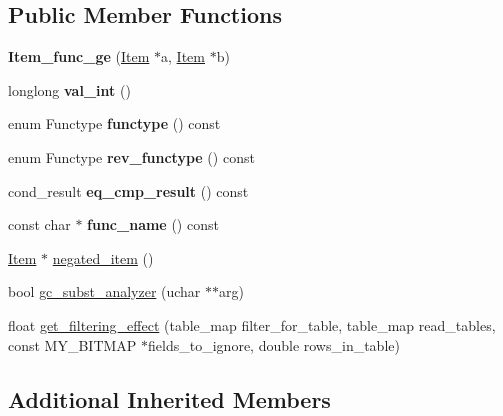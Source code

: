 \subsection*{Public Member Functions}
\begin{DoxyCompactItemize}
\item 
\mbox{\label{classItem__func__ge_a821ea7d8b39396a6848d1951da6a8709}} 
{\bfseries Item\+\_\+func\+\_\+ge} (\mbox{\hyperlink{classItem}{Item}} $\ast$a, \mbox{\hyperlink{classItem}{Item}} $\ast$b)
\item 
\mbox{\label{classItem__func__ge_add571e7245e6aca5de310390790a47e5}} 
longlong {\bfseries val\+\_\+int} ()
\item 
\mbox{\label{classItem__func__ge_ae06acbd8529eb4528dbf8c39cf93e771}} 
enum Functype {\bfseries functype} () const
\item 
\mbox{\label{classItem__func__ge_ad7bd673a6388a820604c86aeed8e102f}} 
enum Functype {\bfseries rev\+\_\+functype} () const
\item 
\mbox{\label{classItem__func__ge_a20ee5b3ea79cc8dcac8e7ef39a6f9561}} 
cond\+\_\+result {\bfseries eq\+\_\+cmp\+\_\+result} () const
\item 
\mbox{\label{classItem__func__ge_a6a7192ebdd42d8d300d0a86b94f8c40a}} 
const char $\ast$ {\bfseries func\+\_\+name} () const
\item 
\mbox{\hyperlink{classItem}{Item}} $\ast$ \mbox{\hyperlink{classItem__func__ge_a83f8b765667646ef94a3771cc6f84f54}{negated\+\_\+item}} ()
\item 
bool \mbox{\hyperlink{classItem__func__ge_af4066c4cdee18479038378285cdb48cb}{gc\+\_\+subst\+\_\+analyzer}} (uchar $\ast$$\ast$arg)
\item 
float \mbox{\hyperlink{classItem__func__ge_a3614027bdff5ae7d70e2e0178c881e05}{get\+\_\+filtering\+\_\+effect}} (table\+\_\+map filter\+\_\+for\+\_\+table, table\+\_\+map read\+\_\+tables, const M\+Y\+\_\+\+B\+I\+T\+M\+AP $\ast$fields\+\_\+to\+\_\+ignore, double rows\+\_\+in\+\_\+table)
\end{DoxyCompactItemize}
\subsection*{Additional Inherited Members}


